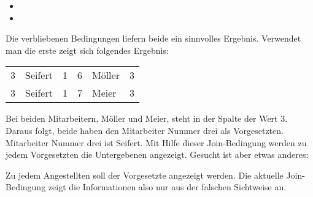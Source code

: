           \begin{itemize}
            \item {}
            \item {}
          \end{itemize}
          Die verbliebenen Bedingungen liefern beide ein sinnvolles Ergebnis. Verwendet man die erste  zeigt sich folgendes Ergebnis:
          \begin{center}
            \begin{small}
              \tablehead{}
              \tabletail {}
              \tablelasttail {}
              \begin{msoraclesql}
                \begin{supertabular}{rlrrlr}
                  3 & Seifert & 1 & 6 & M\"oller & 3 \\
                  3 & Seifert & 1 & 7 & Meier & 3 \\
                \end{supertabular}
              \end{msoraclesql}
            \end{small}
          \end{center}
          Bei beiden Mitarbeitern, M\"oller und Meier, steht in der Spalte  der Wert 3. Daraus folgt, beide haben den Mitarbeiter Nummer drei als Vorgesetzten. Mitarbeiter Nummer drei ist Seifert. Mit Hilfe dieser Join-Bedingung werden zu jedem Vorgesetzten die Untergebenen angezeigt. Gesucht ist aber etwas anderes:

          Zu jedem Angestellten soll der Vorgesetzte angezeigt werden. Die aktuelle Join-Bedingung zeigt die Informationen also nur aus der falschen Sichtweise an.

